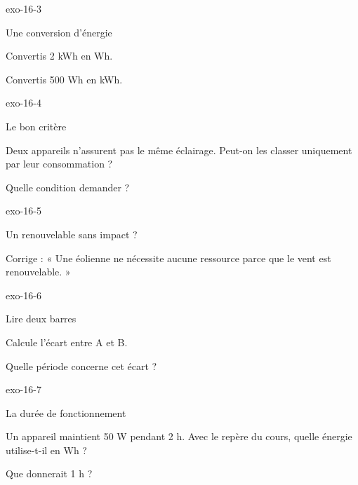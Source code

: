\documentclass[12pt,twoside,openany]{book}
\begin{document}
\begin{blocLivre}{exo-16-3}
\begin{exercice}[1]{Une conversion d’énergie}
\begin{questions}
\item Convertis 2 kWh en Wh.
\item Convertis 500 Wh en kWh.
\end{questions}
\end{exercice}\end{blocLivre}
\begin{blocLivre}{exo-16-4}
\begin{exercice}[1]{Le bon critère}
\begin{questions}
\item Deux appareils n’assurent pas le même éclairage. Peut-on les classer uniquement par leur consommation ?
\item Quelle condition demander ?
\end{questions}
\end{exercice}\end{blocLivre}
\begin{blocLivre}{exo-16-5}
\begin{exercice}[1]{Un renouvelable sans impact ?}
\begin{questions}
\item Corrige : « Une éolienne ne nécessite aucune ressource parce que le vent est renouvelable. »
\end{questions}
\end{exercice}\end{blocLivre}
\begin{blocLivre}{exo-16-6}
\begin{exercice}[2]{Lire deux barres}
\begin{questions}
\item Calcule l’écart entre A et B.
\item Quelle période concerne cet écart ?
\end{questions}
\end{exercice}\end{blocLivre}
\begin{blocLivre}{exo-16-7}
\begin{exercice}[2]{La durée de fonctionnement}
\begin{questions}
\item Un appareil maintient 50 W pendant 2 h. Avec le repère du cours, quelle énergie utilise-t-il en Wh ?
\item Que donnerait 1 h ?
\end{questions}
\end{exercice}\end{blocLivre}
\end{document}
